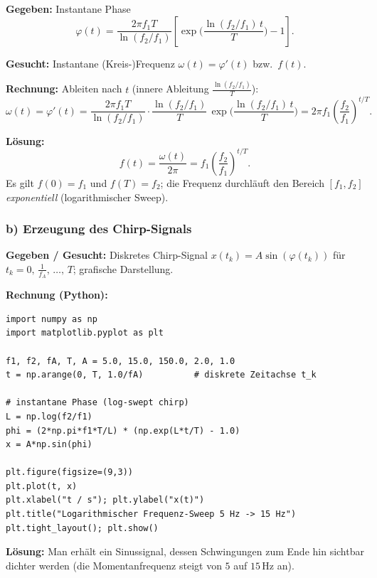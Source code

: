 \begin{beispiel}

\textbf{Gegeben:} Instantane Phase
$$
\varphi(t) = \frac{2\pi f_1 T}{\ln(f_2/f_1)}\left[\exp\!\Big(\frac{\ln(f_2/f_1)\,t}{T}\Big) - 1\right].
$$

\textbf{Gesucht:} Instantane (Kreis-)Frequenz $\omega(t)=\varphi'(t)$ bzw.\ $f(t)$.

\textbf{Rechnung:} Ableiten nach $t$ (innere Ableitung $\tfrac{\ln(f_2/f_1)}{T}$):
$$
\omega(t) = \varphi'(t)
= \frac{2\pi f_1 T}{\ln(f_2/f_1)}\cdot\frac{\ln(f_2/f_1)}{T}\,\exp\!\Big(\frac{\ln(f_2/f_1)\,t}{T}\Big)
= 2\pi f_1 \left(\frac{f_2}{f_1}\right)^{t/T}.
$$

\textbf{Lösung:}
$$
\boxed{\;f(t) = \frac{\omega(t)}{2\pi} = f_1\left(\frac{f_2}{f_1}\right)^{t/T}.\;}
$$
Es gilt $f(0)=f_1$ und $f(T)=f_2$; die Frequenz durchläuft den Bereich
$[f_1,f_2]$ \emph{exponentiell} (logarithmischer Sweep).
\end{beispiel}

\subsubsection*{b) Erzeugung des Chirp-Signals}

\begin{beispiel}

\textbf{Gegeben / Gesucht:} Diskretes Chirp-Signal $x(t_k)=A\sin(\varphi(t_k))$
für $t_k = 0,\,\tfrac{1}{f_A},\,\ldots,\,T$; grafische Darstellung.

\textbf{Rechnung (Python):}
\begin{lstlisting}[style=python]
import numpy as np
import matplotlib.pyplot as plt

f1, f2, fA, T, A = 5.0, 15.0, 150.0, 2.0, 1.0
t = np.arange(0, T, 1.0/fA)          # diskrete Zeitachse t_k

# instantane Phase (log-swept chirp)
L = np.log(f2/f1)
phi = (2*np.pi*f1*T/L) * (np.exp(L*t/T) - 1.0)
x = A*np.sin(phi)

plt.figure(figsize=(9,3))
plt.plot(t, x)
plt.xlabel("t / s"); plt.ylabel("x(t)")
plt.title("Logarithmischer Frequenz-Sweep 5 Hz -> 15 Hz")
plt.tight_layout(); plt.show()
\end{lstlisting}

\textbf{Lösung:} Man erhält ein Sinussignal, dessen Schwingungen zum Ende hin
sichtbar dichter werden (die Momentanfrequenz steigt von $5$ auf $15$\,Hz an).
\end{beispiel}

